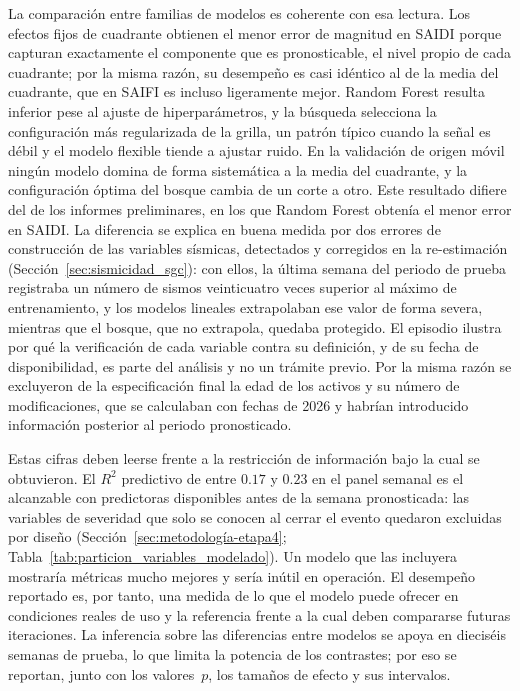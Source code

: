 La comparación entre familias de modelos es coherente con esa lectura. Los efectos fijos de cuadrante obtienen el menor error de magnitud en SAIDI porque capturan exactamente el componente que es pronosticable, el nivel propio de cada cuadrante; por la misma razón, su desempeño es casi idéntico al de la media del cuadrante, que en SAIFI es incluso ligeramente mejor. Random Forest resulta inferior pese al ajuste de hiperparámetros, y la búsqueda selecciona la configuración más regularizada de la grilla, un patrón típico cuando la señal es débil y el modelo flexible tiende a ajustar ruido. En la validación de origen móvil ningún modelo domina de forma sistemática a la media del cuadrante, y la configuración óptima del bosque cambia de un corte a otro. Este resultado difiere del de los informes preliminares, en los que Random Forest obtenía el menor error en SAIDI. La diferencia se explica en buena medida por dos errores de construcción de las variables sísmicas, detectados y corregidos en la re-estimación (Sección~\ref{sec:sismicidad_sgc}): con ellos, la última semana del periodo de prueba registraba un número de sismos veinticuatro veces superior al máximo de entrenamiento, y los modelos lineales extrapolaban ese valor de forma severa, mientras que el bosque, que no extrapola, quedaba protegido. El episodio ilustra por qué la verificación de cada variable contra su definición, y de su fecha de disponibilidad, es parte del análisis y no un trámite previo. Por la misma razón se excluyeron de la especificación final la edad de los activos y su número de modificaciones, que se calculaban con fechas de 2026 y habrían introducido información posterior al periodo pronosticado.

Estas cifras deben leerse frente a la restricción de información bajo la cual se obtuvieron. El $R^2$ predictivo de entre $0{.}17$ y $0{.}23$ en el panel semanal es el alcanzable con predictoras disponibles antes de la semana pronosticada: las variables de severidad que solo se conocen al cerrar el evento quedaron excluidas por diseño (Sección~\ref{sec:metodología-etapa4}; Tabla~\ref{tab:particion_variables_modelado}). Un modelo que las incluyera mostraría métricas mucho mejores y sería inútil en operación. El desempeño reportado es, por tanto, una medida de lo que el modelo puede ofrecer en condiciones reales de uso y la referencia frente a la cual deben compararse futuras iteraciones. La inferencia sobre las diferencias entre modelos se apoya en dieciséis semanas de prueba, lo que limita la potencia de los contrastes; por eso se reportan, junto con los valores~$p$, los tamaños de efecto y sus intervalos.


